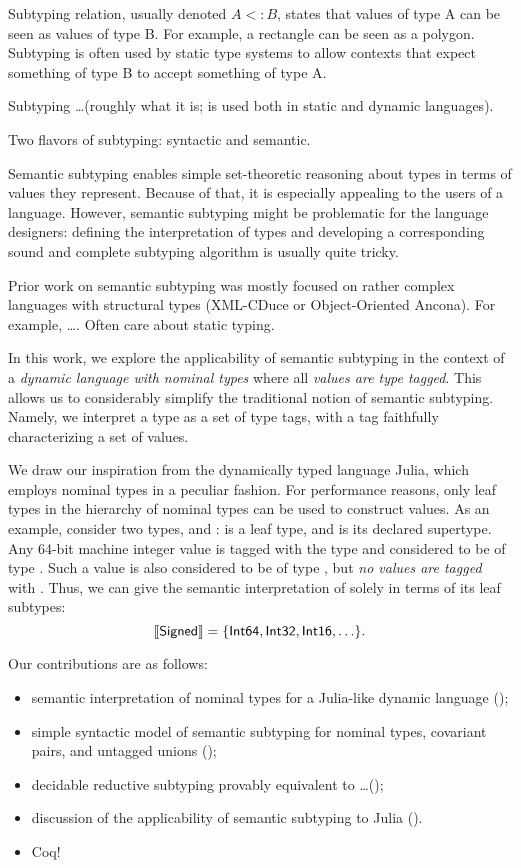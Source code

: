 Subtyping relation, usually denoted $A<:B$, states that 
    values of type A can be seen as values of type B. For example,
    a rectangle can be seen as a polygon.
    Subtyping is often used by static type systems to allow contexts that
    expect something of type B to accept something of type A.

Subtyping \ldots (roughly what it is; is used both in static and dynamic
languages).

Two flavors of subtyping: syntactic and semantic. 

Semantic subtyping enables simple set-theoretic reasoning about types
in terms of values they represent.
Because of that, it is especially appealing to the users of a language.
However, semantic subtyping might be problematic for the language designers:
defining the interpretation of types and developing a corresponding
sound and complete subtyping algorithm is usually quite tricky.

Prior work on semantic subtyping was mostly focused on rather complex languages
with structural types (XML-CDuce or Object-Oriented Ancona).
For example, \ldots. Often care about static typing.

In this work, we explore the applicability of semantic subtyping in the context
of a \emph{dynamic language with nominal types} 
where all \emph{values are type tagged}. 
This allows us to considerably simplify the traditional notion 
of semantic subtyping.
Namely, we interpret a type as a set of type tags, 
with a tag faithfully characterizing a set of values.

We draw our inspiration from the dynamically typed language Julia,
which employs nominal types in a peculiar fashion. For performance reasons, 
only leaf types in the hierarchy of nominal types
can be used to construct values.
As an example, consider two types,  and :
 is a leaf type, 
and  is its declared supertype.
Any 64-bit machine integer value is tagged with the type 
and considered to be of type .
Such a value is also considered to be of type ,
but \emph{no values are tagged} with .
Thus, we can give the semantic interpretation of 
solely in terms of its leaf subtypes:
\[
\llbracket \mathsf{Signed} \rrbracket = \{\mathsf{Int64}, \mathsf{Int32}, \mathsf{Int16}, \ldots\}.
\]

Our contributions are as follows:
\begin{itemize}
  \item semantic interpretation of nominal types for a Julia-like 
    dynamic language ();
  \item simple syntactic model of semantic subtyping for nominal types,
    covariant pairs, and untagged unions ();
  \item decidable reductive subtyping provably equivalent to \ldots ();
  \item discussion of the applicability of semantic subtyping to Julia ().
  \item Coq!
\end{itemize}

